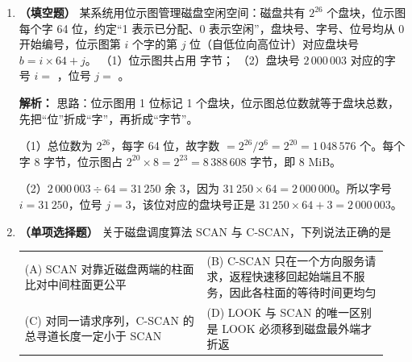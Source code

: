 \begin{enumerate}
\ifshowsolutions\par\noindent\textbf{解析：} 连续分配用“起始块号 + 长度”描述文件，第 $i$ 块地址可直接算出，所以随机访问快；代价是必须占用连续空间，文件变长时若后面紧邻的块已被别的文件占用，就只能把整个文件搬到足够大的空闲区，并修改目录项中的起始块号，因此 (A) 正确。

(B) 错：隐式链接的指针存在每个数据块里，必须从第一块起逐块读，访问第 $i$ 块一般需要 $i$ 次读盘。(C) 错：索引块存的是数据块号，不是数据本身。(D) 错：连续分配正是外部碎片的典型来源——空闲区被已分配区切成许多不连续的小块，总空闲量够但凑不出连续空间。\else \answerarea \fi

\vspace{8pt}

\item \textbf{（填空题）} 某系统用位示图管理磁盘空闲空间：磁盘共有 $2^{26}$ 个盘块，位示图每个字 64 位，约定“1 表示已分配、0 表示空闲”，盘块号、字号、位号均从 0 开始编号，位示图第 $i$ 个字的第 $j$ 位（自低位向高位计）对应盘块号 $b=i\times 64+j$。
（1）位示图共占用 \underline{\hspace{2.6cm}} 字节；
（2）盘块号 $2\,000\,003$ 对应的字号 $i=$ \underline{\hspace{1.8cm}}，位号 $j=$ \underline{\hspace{1.4cm}}。

\ifshowsolutions\par\noindent\textbf{解析：} 思路：位示图用 1 位标记 1 个盘块，位示图总位数就等于盘块总数，先把“位”折成“字”，再折成“字节”。

（1）总位数为 $2^{26}$，每字 64 位，故字数 $=2^{26}/2^{6}=2^{20}=1\,048\,576$ 个。每个字 8 字节，位示图占 $2^{20}\times 8=2^{23}=8\,388\,608$ 字节，即 8 MiB。

（2）$2\,000\,003 \div 64 = 31\,250$ 余 3，因为 $31\,250\times 64 = 2\,000\,000$。所以字号 $i=31\,250$，位号 $j=3$，该位对应的盘块号正是 $31\,250\times 64+3=2\,000\,003$。

\else \answerarea[5] \fi

\vspace{8pt}

\item \textbf{（单项选择题）} 关于磁盘调度算法 SCAN 与 C-SCAN，下列说法正确的是
\begin{center}
\begin{tabular}{p{0.47\linewidth}p{0.47\linewidth}}
(A) SCAN 对靠近磁盘两端的柱面比对中间柱面更公平 & (B) C-SCAN 只在一个方向服务请求，返程快速移回起始端且不服务，因此各柱面的等待时间更均匀 \\[4pt]
(C) 对同一请求序列，C-SCAN 的总寻道长度一定小于 SCAN & (D) LOOK 与 SCAN 的唯一区别是 LOOK 必须移到磁盘最外端才折返
\end{tabular}
\end{center}


\end{enumerate}

